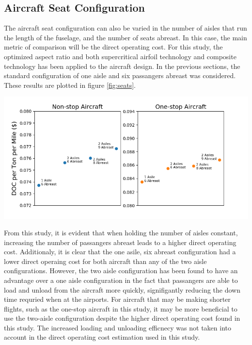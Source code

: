 \documentclass{article}
\begin{document}
    \subsection{Aircraft Seat Configuration}
    \label{sec:seat configuration}
        \begin{flushleft}
            The aircraft seat configuration can also be varied in the number of
            aisles that run the length of the fuselage, and the number of seats
            abreast. In this case, the main metric of comparison will be the
            direct operating cost. For this study, the optimized aspect ratio
            and both supercritical airfoil technology and composite technology
            has been applied to the aircraft design. In the previous sections, the
            standard configuration of one aisle and six passangers abreast
            was considered. These results are plotted in figure \ref{fig:seats}.
        \end{flushleft}

        \begin{center}
            \includegraphics[scale=0.7]{seating.PNG}
            \label{fig:seats}
        \end{center}

        \begin{flushleft}
            From this study, it is evident that when holding the number of
            aisles constant, increasing the number of passangers abreast leads
            to a higher direct operating cost. Additionaly, it is clear that the
            one asile, six abreast configuration had a lower direct operaing
            cost for both aircraft than any of the two aisle configurations.
            However, the two aisle configuration has been found to have an
            advantage over a one aisle configuration in the fact that passangers
            are able to load and unload from the aircraft more quickly,
            signifigantly reducing the down time requried when at the airports.
            For aircraft that may be making shorter flights, such as the
            one-stop aircraft in this study, it may be more beneficial to use
            the two-aisle configuration despite the higher direct operating cost
            found in this study. The increased loading and unloading efficnecy
            was not taken into account in the direct operating cost estimation
            used in this study.
        \end{flushleft}
\end{document}
